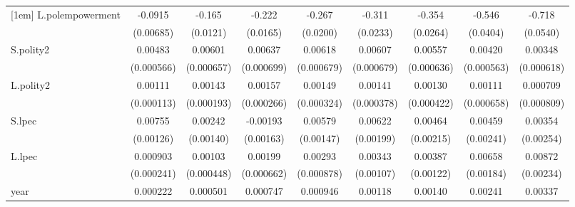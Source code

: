 \begin{table}[htbp]
\begin{tabular}{l*{8}{c}}
[1em]
L.polempowerment    &     -0.0915\sym{***}&      -0.165\sym{***}&      -0.222\sym{***}&      -0.267\sym{***}&      -0.311\sym{***}&      -0.354\sym{***}&      -0.546\sym{***}&      -0.718\sym{***}\\
                    &   (0.00685)         &    (0.0121)         &    (0.0165)         &    (0.0200)         &    (0.0233)         &    (0.0264)         &    (0.0404)         &    (0.0540)         \\
[1em]
S.polity2           &     0.00483\sym{***}&     0.00601\sym{***}&     0.00637\sym{***}&     0.00618\sym{***}&     0.00607\sym{***}&     0.00557\sym{***}&     0.00420\sym{***}&     0.00348\sym{***}\\
                    &  (0.000566)         &  (0.000657)         &  (0.000699)         &  (0.000679)         &  (0.000679)         &  (0.000636)         &  (0.000563)         &  (0.000618)         \\
[1em]
L.polity2           &     0.00111\sym{***}&     0.00143\sym{***}&     0.00157\sym{***}&     0.00149\sym{***}&     0.00141\sym{***}&     0.00130\sym{***}&     0.00111\sym{*}  &    0.000709         \\
                    &  (0.000113)         &  (0.000193)         &  (0.000266)         &  (0.000324)         &  (0.000378)         &  (0.000422)         &  (0.000658)         &  (0.000809)         \\
[1em]
S.lpec              &     0.00755\sym{***}&     0.00242\sym{*}  &    -0.00193         &     0.00579\sym{***}&     0.00622\sym{***}&     0.00464\sym{**} &     0.00459\sym{*}  &     0.00354         \\
                    &   (0.00126)         &   (0.00140)         &   (0.00163)         &   (0.00147)         &   (0.00199)         &   (0.00215)         &   (0.00241)         &   (0.00254)         \\
[1em]
L.lpec              &    0.000903\sym{***}&     0.00103\sym{**} &     0.00199\sym{***}&     0.00293\sym{***}&     0.00343\sym{***}&     0.00387\sym{***}&     0.00658\sym{***}&     0.00872\sym{***}\\
                    &  (0.000241)         &  (0.000448)         &  (0.000662)         &  (0.000878)         &   (0.00107)         &   (0.00122)         &   (0.00184)         &   (0.00234)         \\
[1em]
year                &    0.000222\sym{***}&    0.000501\sym{***}&    0.000747\sym{***}&    0.000946\sym{***}&     0.00118\sym{***}&     0.00140\sym{***}&     0.00241\sym{***}&     0.00337\sym{***}\\

\end{tabular}
\end{table}
